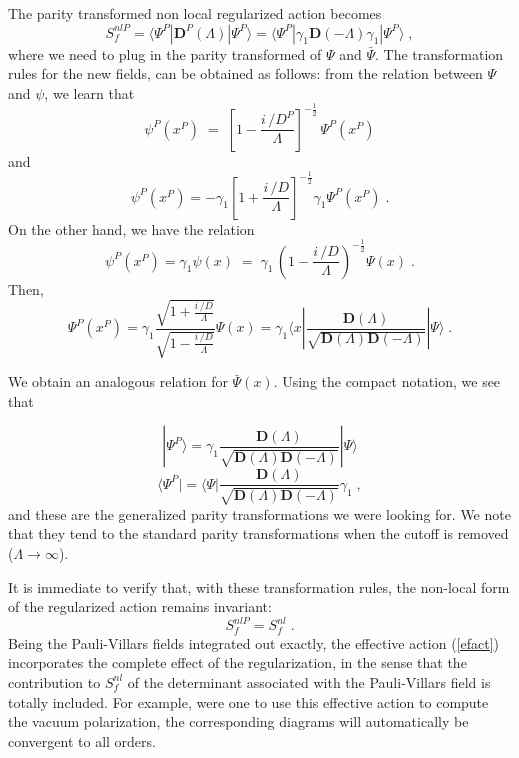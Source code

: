 \documentclass[a4paper,12pt]{article}
\newcommand{\Dcslash}{/\!\!\!\! D}
\begin{document}
The parity transformed non local regularized action becomes
\begin{equation}
S_f^{nlP}=\langle\Psi^P| {\mathbf D}^P(\Lambda) |\Psi^P\rangle = 
\langle\Psi^P| \gamma_1 {\mathbf D}(-\Lambda) \gamma_1|\Psi^P\rangle \;,
\end{equation}
where we need to plug in the parity transformed of $\Psi$ and
${\bar\Psi}$. The transformation rules for the new fields, can be
obtained as follows: from the relation between $\Psi$ and $\psi$, we
learn that
\begin{equation}
\psi^P(x^P) \;=\;
\left[1-\frac{i\,\Dcslash^P}{\Lambda}\right]^{-\frac{1}{2}}\,
\Psi^P(x^P)
\end{equation} 
and
\begin{equation}
\psi^P(x^P)=-\gamma_1 \left[1+\frac{i\,\Dcslash}{\Lambda}\right]^{-\frac{1}{2}}
\gamma_1\Psi^P(x^P) \;.
\end{equation}
On the other hand, we have the relation
\begin{equation}
\psi^P(x^P) = \gamma_1 \psi (x) \;=\;
\gamma_1 \,\left(1-\frac{i\,\Dcslash}{\Lambda}\right)^{-\frac{1}{2}}\Psi(x) \;.
\end{equation}
Then,
\begin{equation}
\Psi^P(x^P)=\gamma_1\frac{\sqrt{1+\frac{i\,\Dcslash}{\Lambda}}}
{\sqrt{1-\frac{i\,\Dcslash}{\Lambda}}}\Psi(x)=\gamma_1\langle
x|\frac{{\mathbf D}(\Lambda)}
{\sqrt{{\mathbf D}(\Lambda){\mathbf D}(-\Lambda)}} |\Psi \rangle \;.
\end{equation}

We obtain an analogous relation for $\bar{\Psi}(x)$. Using the compact
notation, we see that

\begin{equation}
 \label{eq:comp1}
|\Psi^P\rangle=\gamma_1 \frac{{\mathbf D}(\Lambda)}{\sqrt{{\mathbf D}(\Lambda){\mathbf D}(-\Lambda)}} |\Psi\rangle
\end{equation}
\begin{equation}
 \label{eq:comp2}
\langle \Psi^P|=\langle\Psi|\frac{{\mathbf D}(\Lambda)}{\sqrt{{\mathbf
      D}(\Lambda){\mathbf D}(-\Lambda)}} \gamma_1 \;,
\end{equation}
and these are the generalized parity transformations we were looking
for. We note that they tend to the standard parity transformations
when the cutoff is removed ($\Lambda \to \infty$).

It is immediate to verify that, with these transformation rules, the
non-local form of the regularized action remains invariant:
\begin{equation}
 \label{eq:snlinv}
S_f^{nl P}=S_f^{nl} \;.
\end{equation}
%
Being the Pauli-Villars fields integrated out exactly,
the effective action (\ref{efact})
 incorporates the complete effect of the regularization, in
the sense that 
 the contribution to $S_f^{nl}$ of the
determinant associated with the Pauli-Villars field is totally
 included. For 
example, were one to use this effective action to compute the
vacuum polarization, the corresponding diagrams will automatically
be convergent to all orders. 
\end{document}
